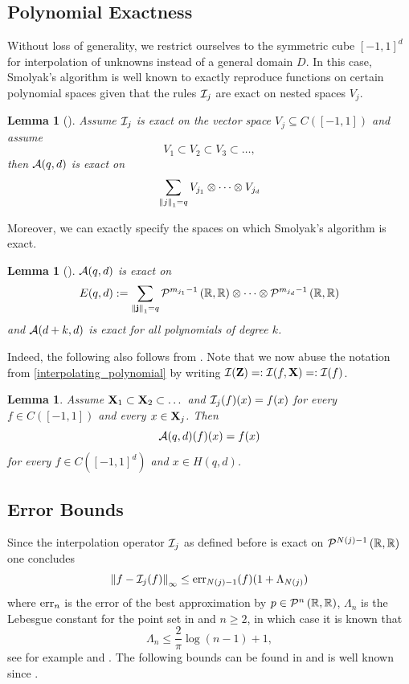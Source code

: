 \documentclass[12pt, oneside]{amsart}
\newtheorem{lem}[thm]{Lemma}
\theoremstyle{definition}
\theoremstyle{remark}
\numberwithin{equation}{section}
\begin{document}
\subsection{Polynomial Exactness}
Without loss of generality, we restrict ourselves to the symmetric cube \([-1, 
1]^d\)  for 
interpolation of unknowns instead of a general domain \(D\). In this case, 
Smolyak's algorithm is well known to exactly reproduce functions on certain 
polynomial spaces given that the rules \(\cI_j\) are exact on nested spaces 
\(V_j\).
\begin{lem}[\cite{DELVOS198299,novakRitter1996}]
	Assume \(\cI_j\) is exact on the vector space \(V_j \subseteq C([-1, 1])\) 
	and assume \[
	V_1 \subset V_2 \subset V_3 \subset \dots,
	\]
	then \(\cA(q, d)\) is exact on \[
	\sum_{\norm[1]{j}=q} V_{j_1} \otimes \cdots \otimes V_{j_d}
	\]
\end{lem}
Moreover, we can exactly specify the spaces on which Smolyak's algorithm is exact.
\begin{lem}[\cite{BarthelmannHighDim_2000}]
	\(\cA(q, d)\) is exact on \[
	E(q, d) \defn \sum_{\norm[1]{\bfj} = q} \pols[m_{j_1}-1]{\R, \R} \otimes 
	\cdots \otimes \pols[m_{j_d}-1]{\R, \R}
	\]
	and \(\cA(d+k, d)\) is exact for all polynomials of degree \(k\).
\end{lem}
Indeed, the following also follows from \cite{BarthelmannHighDim_2000}. Note 
that we now abuse the notation from \ref{interpolating_polynomial} by writing 
\(\cI(\ZZ) \revdefn \cI(f, \XX) \revdefn \cI(f)\).
\begin{lem}
	Assume \(\XX_1 \subset \XX_2 \subset \dots\) and \(\cI_j(f)(x) = f(x)\) for 
	every \(f \in C([-1, 1])\) and every \(x \in \XX_j\). Then \[
	\cA(q, d)(f)(x) = f(x)
	\]
	for every \(f \in C([-1, 1]^d)\) and \(x \in H(q, d)\).
\end{lem}

\subsection{Error Bounds}
Since the interpolation operator \(\cI_j\) as defined before is exact on 
\(\pols[N(j)-1]{\R, \R}\) one concludes \[
\norm[\infty]{f - \cI_j(f)} \leq \err_{N(j)-1}(f)(1+\Lambda_{N(j)})
\]
where \(\err_n\) is the error of the best approximation by \(p \in \pols[n]{\R, 
\R}\), \(\Lambda_n\) is the Lebesgue constant for the point set in 
 and \(n \geq 2\), in which case it is known that \[
\Lambda_n \leq \frac{2}{\pi} \log(n-1)+1,
\]
see for example \cite{zeller1966} and \cite{Dzjadyk1983}. The following bounds 
can be found in \cite{BarthelmannHighDim_2000} and is well known since 
\cite{smolyak1963, temlyakov1986, WASILKOWSKI19951}.
\end{document}
